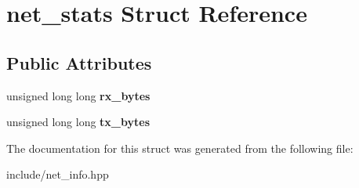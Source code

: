 \hypertarget{structnet__stats}{}\section{net\+\_\+stats Struct Reference}
\label{structnet__stats}
\subsection*{Public Attributes}
\begin{DoxyCompactItemize}
\item 
\mbox{\label{structnet__stats_a2f6be663b04f109e9e35e0eab9e9bc5b}} 
unsigned long long {\bfseries rx\+\_\+bytes}
\item 
\mbox{\label{structnet__stats_a440c5ec4c1628cb7f9221905765a0086}} 
unsigned long long {\bfseries tx\+\_\+bytes}
\end{DoxyCompactItemize}


The documentation for this struct was generated from the following file\+:\begin{DoxyCompactItemize}
\item 
include/net\+\_\+info.\+hpp\end{DoxyCompactItemize}
